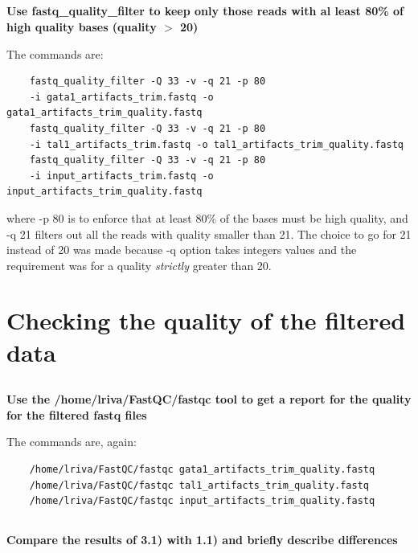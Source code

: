 \documentclass[12pt, a4paper]{article}
\begin{document}
	\subsection{}
	\textbf{Use fastq\_quality\_filter to keep only those reads with al least 80\% of high quality bases (quality $>$ 20)}
	
	The commands are:
	
	\begin{verbatim}
	fastq_quality_filter -Q 33 -v -q 21 -p 80
	-i gata1_artifacts_trim.fastq -o gata1_artifacts_trim_quality.fastq
	fastq_quality_filter -Q 33 -v -q 21 -p 80
	-i tal1_artifacts_trim.fastq -o tal1_artifacts_trim_quality.fastq
	fastq_quality_filter -Q 33 -v -q 21 -p 80
	-i input_artifacts_trim.fastq -o input_artifacts_trim_quality.fastq
	\end{verbatim}
	
	where -p 80 is to enforce that at least 80\% of the bases must be high quality, and -q 21 filters out all the reads with quality smaller than 21. The choice to go for 21 instead of 20 was made because -q option takes integers values and the requirement was for a quality \textit{strictly} greater than 20.
	
	\section{Checking the quality of the filtered data}
	
	\subsection{}
	\textbf{Use the /home/lriva/FastQC/fastqc tool to get a report for the quality for the filtered fastq files}
	
	The commands are, again:
	
	\begin{verbatim}
	/home/lriva/FastQC/fastqc gata1_artifacts_trim_quality.fastq
	/home/lriva/FastQC/fastqc tal1_artifacts_trim_quality.fastq
	/home/lriva/FastQC/fastqc input_artifacts_trim_quality.fastq
	\end{verbatim}
	
	\subsection{}
	\textbf{Compare the results of 3.1) with 1.1) and briefly describe differences}
	
\end{document}
